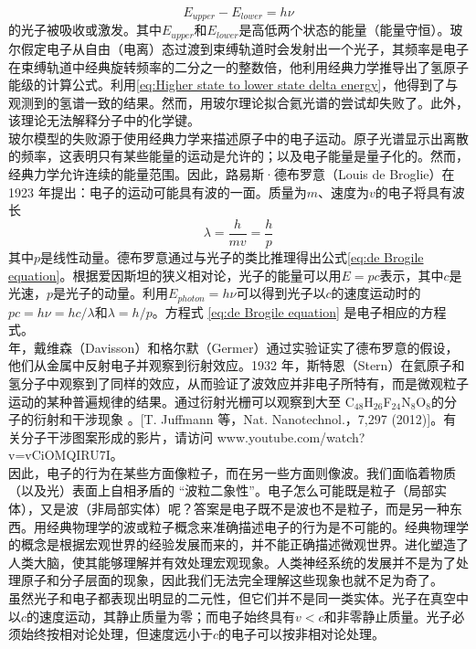 \documentclass{book}
\begin{document}
	\begin{equation}
		\boxed{E_{upper}-E_{lower}=h\nu}
		\label{eq:Higher state to lower state delta energy}
	\end{equation}
	的光子被吸收或激发。其中$E_{upper}$和$E_{lower}$是高低两个状态的能量（能量守恒）。玻尔假定电子从自由（电离）态过渡到束缚轨道时会发射出一个光子，其频率是电子在束缚轨道中经典旋转频率的二分之一的整数倍，他利用经典力学推导出了氢原子能级的计算公式。利用\ref{eq:Higher state to lower state delta energy}，他得到了与观测到的氢谱一致的结果。然而，用玻尔理论拟合氦光谱的尝试却失败了。此外，该理论无法解释分子中的化学键。\\
	\indent 玻尔模型的失败源于使用经典力学来描述原子中的电子运动。原子光谱显示出离散的频率，这表明只有某些能量的运动是允许的；以及电子能量是量子化的。然而，经典力学允许连续的能量范围。因此，路易斯·德布罗意（Louis de Broglie）在 1923 年提出：电子的运动可能具有波的一面。质量为$m$、速度为$v$的电子将具有波长
	\begin{equation}
		\lambda=\frac{h}{mv}=\frac{h}{p}
		\label{eq:de Brogile equation}
	\end{equation}
	其中$p$是线性动量。德布罗意通过与光子的类比推理得出公式\ref{eq:de Brogile equation}。根据爱因斯坦的狭义相对论，光子的能量可以用$E=pc$表示，其中$c$是光速，$p$是光子的动量。利用$E_{photon}=h\nu$可以得到光子以$c$的速度运动时的$pc=h\nu =hc/\lambda$和$\lambda = h/p$。方程式 \ref{eq:de Brogile equation} 是电子相应的方程式。\\
	 年，戴维森（Davisson）和格尔默（Germer）通过实验证实了德布罗意的假设，他们从金属中反射电子并观察到衍射效应。1932 年，斯特恩（Stern）在氦原子和氢分子中观察到了同样的效应，从而验证了波效应并非电子所特有，而是微观粒子运动的某种普遍规律的结果。通过衍射光栅可以观察到大至 C$_{48}$H$_{26}$F$_{24}$N$_8$O$_8$的分子的衍射和干涉现象	。[T. Juffmann 等，Nat. Nanotechnol.，7,297 (2012)]。有关分子干涉图案形成的影片，请访问 www.youtube.com/watch?v=vCiOMQIRU7I。\\
	\indent 因此，电子的行为在某些方面像粒子，而在另一些方面则像波。我们面临着物质（以及光）表面上自相矛盾的 “波粒二象性”。电子怎么可能既是粒子（局部实体），又是波（非局部实体）呢？答案是电子既不是波也不是粒子，而是另一种东西。用经典物理学的波或粒子概念来准确描述电子的行为是不可能的。经典物理学的概念是根据宏观世界的经验发展而来的，并不能正确描述微观世界。进化塑造了人类大脑，使其能够理解并有效处理宏观现象。人类神经系统的发展并不是为了处理原子和分子层面的现象，因此我们无法完全理解这些现象也就不足为奇了。\\
	\indent 虽然光子和电子都表现出明显的二元性，但它们并不是同一类实体。光子在真空中以$c$的速度运动，其静止质量为零；而电子始终具有$v<c$和非零静止质量。光子必须始终按相对论处理，但速度远小于$c$的电子可以按非相对论处理。
	
\end{document}
